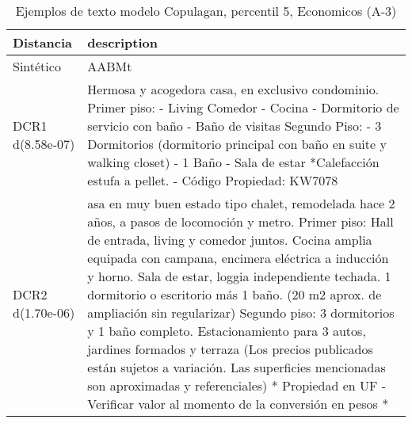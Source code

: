\begin{table}[H]
\centering
\fontsize{10}{14}\selectfont
\caption{Ejemplos de texto modelo Copulagan, percentil 5, Economicos (A-3)}
\label{table-example-economicos-a-3-copulagan-5p-text}
\begin{tabular}{|l|m{35em}|}
\hline
\rowcolor[gray]{0.8}
Distancia & description \\
\hline Sintético & AABMt \\
\hline DCR1 d(8.58e-07) & Hermosa y acogedora casa, en exclusivo condominio.  Primer piso: - Living Comedor  - Cocina  - Dormitorio de servicio con ba\~no - Ba\~no de visitas  Segundo Piso: - 3 Dormitorios (dormitorio principal con ba\~no en suite y walking closet) - 1 Ba\~no - Sala de estar *Calefacci\'on estufa a pellet. - C\'odigo Propiedad: KW7078 \\
\hline DCR2 d(1.70e-06) & asa en muy buen estado tipo chalet, remodelada hace 2 a\~nos, a pasos de locomoci\'on y metro.
Primer piso: Hall de entrada, living y comedor juntos. Cocina amplia equipada con campana, encimera el\'ectrica a inducci\'on y horno. Sala de estar, loggia independiente techada. 1 dormitorio o escritorio m\'as 1 ba\~no. (20 m2 aprox. de ampliaci\'on sin regularizar)
Segundo piso: 3 dormitorios y 1 ba\~no completo.
Estacionamiento para 3 autos, jardines formados y terraza
(Los precios publicados est\'an sujetos a variaci\'on. Las superficies mencionadas son aproximadas y referenciales)
* Propiedad en UF - Verificar valor al momento de la conversi\'on en pesos * \\
\hline
\end{tabular}
\end{table}
